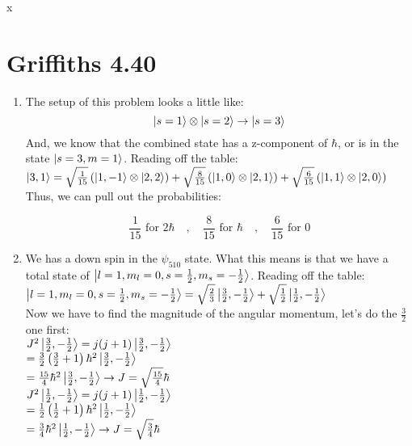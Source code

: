 x\documentclass[12pt]{article}
\begin{document}
\section*{Griffiths 4.40}
\begin{enumerate}[label=\alph*)]
\item The setup of this problem looks a little like: 
\[\ket{s=1}\otimes \ket{s=2} \rightarrow \ket{s=3}\]
And, we know that the combined state has a z-component of $\hbar$, or is in the state $\ket{s=3, m=1}$. Reading off the table:\vspace{0.5em}\\
$\ket{3, 1} = \sqrt{\frac{1}{15}}\left(\ket{1, -1} \otimes \ket{2, 2}\right) + \sqrt{\frac{8}{15}}\left(\ket{1, 0} \otimes \ket{2, 1}\right) + \sqrt{\frac{6}{15}}\left(\ket{1, 1} \otimes \ket{2, 0}\right)$\vspace{0.5em}\\
Thus, we can pull  out the probabilities:

\[\boxed{\frac{1}{15} \text{ for } 2\hbar \quad , \quad \frac{8}{15} \text{ for } \hbar \quad , \quad \frac{6}{15} \text{ for } 0 }\]

\item 

We has a down spin in the $\psi_{510}$ state. What this means is that we have a total state of $\ket{l=1, m_l = 0, s=\frac{1}{2}, m_s = -\frac{1}{2}}$. Reading off the table: \vspace{0.5em}\\
$\ket{l=1, m_l = 0, s=\frac{1}{2}, m_s = -\frac{1}{2}} = \sqrt{\frac{2}{3}}\ket{\frac{3}{2}, -\frac{1}{2}} + \sqrt{\frac{1}{2}}\ket{\frac{1}{2}, -\frac{1}{2}}$\vspace{0.5em}\\
Now we have to find the magnitude of the angular momentum, let's do the $\frac{3}{2}$ one first:\vspace{0.5em}\\
$J^2 \ket{\frac{3}{2}, -\frac{1}{2}} = j(j+1) \ket{\frac{3}{2}, -\frac{1}{2}}$\vspace{0.5em}\\
\hspace*{4.4em} $ = \frac{3}{2}\left(\frac{3}{2} + 1\right)\hbar^2  \ket{\frac{3}{2}, -\frac{1}{2}}$\vspace{0.5em}\\
\hspace*{4.4em} $= \frac{15}{4}\hbar^2 \ket{\frac{3}{2}, -\frac{1}{2}} \rightarrow J = \sqrt{\frac{15}{4}}\hbar$\vspace{1.5em}\\
$J^2 \ket{\frac{1}{2}, -\frac{1}{2}} = j(j+1) \ket{\frac{1}{2}, -\frac{1}{2}}$\vspace{0.5em}\\
\hspace*{4.4em} $ = \frac{1}{2}\left(\frac{1}{2} + 1\right)\hbar^2  \ket{\frac{1}{2}, -\frac{1}{2}}$\vspace{0.5em}\\
\hspace*{4.4em} $= \frac{3}{4}\hbar^2 \ket{\frac{1}{2}, -\frac{1}{2}} \rightarrow J = \sqrt{\frac{3}{4}}\hbar$


\end{enumerate}
\end{document}
